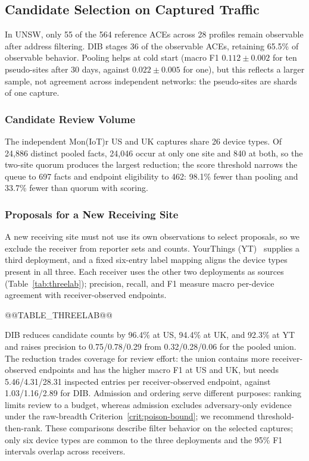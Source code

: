 \subsection{Candidate Selection on Captured Traffic}
\label{sec:utility-results}
In UNSW, only 55 of the 564 reference ACEs across 28 profiles remain observable after address filtering. DIB stages 36 of the observable ACEs, retaining 65.5\% of observable behavior. Pooling helps at cold start (macro F1 $0.112\pm0.002$ for ten pseudo-sites after 30 days, against $0.022\pm0.005$ for one), but this reflects a larger sample, not agreement across independent networks: the pseudo-sites are shards of one capture.

\subsubsection{Candidate Review Volume}
\label{sec:workload-results}
The independent Mon(IoT)r US and UK captures share 26 device types. Of 24,886 distinct pooled facts, 24,046 occur at only one site and 840 at both, so the two-site quorum produces the largest reduction; the score threshold narrows the queue to 697 facts and endpoint eligibility to 462: 98.1\% fewer than pooling and 33.7\% fewer than quorum with scoring.

\subsubsection{Proposals for a New Receiving Site}
\label{sec:loo-results}
A new receiving site must not use its own observations to select proposals, so we exclude the receiver from reporter sets and counts. YourThings (YT)~\cite{alrawi2019yourthings} supplies a third deployment, and a fixed six-entry label mapping aligns the device types present in all three. Each receiver uses the other two deployments as sources (Table~\ref{tab:threelab}); precision, recall, and F1 measure macro per-device agreement with receiver-observed endpoints.

@@TABLE_THREELAB@@

DIB reduces candidate counts by 96.4\% at US, 94.4\% at UK, and 92.3\% at YT and raises precision to 0.75/0.78/0.29 from 0.32/0.28/0.06 for the pooled union. The reduction trades coverage for review effort: the union contains more receiver-observed endpoints and has the higher macro F1 at US and UK, but needs 5.46/4.31/28.31 inspected entries per receiver-observed endpoint, against 1.03/1.16/2.89 for DIB. Admission and ordering serve different purposes: ranking limits review to a budget, whereas admission excludes adversary-only evidence under the raw-breadth Criterion~\ref{crit:poison-bound}; we recommend threshold-then-rank. These comparisons describe filter behavior on the selected captures; only six device types are common to the three deployments and the 95\% F1 intervals overlap across receivers.

